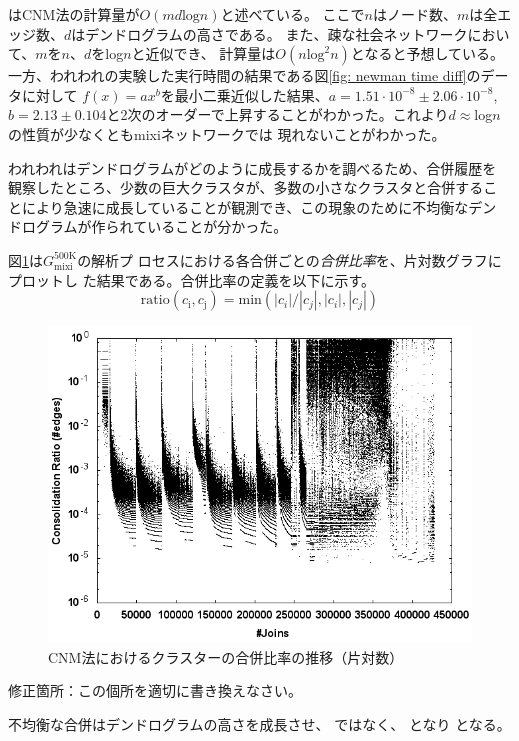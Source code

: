 \documentclass [a4j,11pt] {jsarticle}
\begin{document}
\cite{Clauset04}はCNM法の計算量が$O(md\text{log}n)$と述べている。
ここで$n$はノード数、$m$は全エッジ数、$d$はデンドログラムの高さである。
また、疎な社会ネットワークにおいて、$m$を$n$、$d$をlog$n$と近似でき、
計算量は$O(n\text{log}^2 n)$となると予想している。
一方、われわれの実験した実行時間の結果である図\ref{fig: newman time diff}のデータに対して
$f(x) = ax^b$を最小二乗近似した結果、$a = 1.51\cdot10^{-8} \pm2.06\cdot10^{-8}$,
$b = 2.13\pm0.104$と2次のオーダーで上昇することがわかった。これより$d\approx$log$n$の性質が少なくともmixiネットワークでは
現れないことがわかった。

われわれはデンドログラムがどのように成長するかを調べるため、合併履歴を
観察したところ、少数の巨大クラスタが、多数の小さなクラスタと合併するこ
とにより急速に成長していることが観測でき、この現象のために不均衡なデン
ドログラムが作られていることが分かった。

図\ref {fig: clauset ratio}は$G_{\text {mixi}}^{\text {500K}}$の解析プ
ロセスにおける各合併ごとの\emph {合併比率}を、片対数グラフにプロットし
た結果である。合併比率の定義を以下に示す。
\[\text{ratio}(c_{\text{i}},c_{\text{j}}) = \text{min}(|c_i|/|c_j|,|c_i|,|c_j|)\]%

\begin {figure}[htbp]
  \centerline {\includegraphics [width=0.80\linewidth]{fig3-cnm-ratio-join.png}}
  \caption {CNM法におけるクラスターの合併比率の推移（片対数）}
  \label {fig: clauset ratio}
\end{figure}

修正箇所：この個所を適切に書き換えなさい。

不均衡な合併はデンドログラムの高さを成長させ、
ではなく、
となり
となる。
\end{document}

